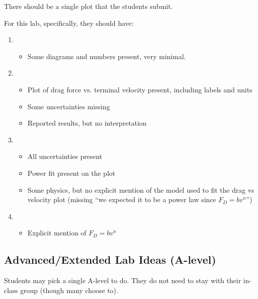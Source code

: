 \documentclass[fleqn,letterpaper]{article}
\begin{document}
There should be a single plot that the students submit.

For this lab, specifically, they should have:

\begin{enumerate}
 \item{
  \begin{itemize}
   \item{Some diagrams and numbers present, very minimal.}
  \end{itemize}
}
 \item{
  \begin{itemize}
   \item{Plot of drag force vs. terminal velocity present, including labels and units}
   \item{Some uncertainties missing}
   \item{Reported results, but no interpretation}
  \end{itemize}
}
 \item{
  \begin{itemize}
   \item{All uncertainties present}
   \item{Power fit present on the plot}
   \item{Some physics, but no explicit mention of the model used to fit the drag vs velocity plot (missing ``we expected it to be a power law since $F_D = b v^n$'')}
  \end{itemize}
}
 \item{
  \begin{itemize}
   \item{Explicit mention of $F_D = b v^n$}
  \end{itemize}
}
\end{enumerate}


\subsection*{Advanced/Extended Lab Ideas (A-level)}

Students may pick a single A-level to do.  They do not need to stay with their in-class group (though many choose to).
\end{document}
